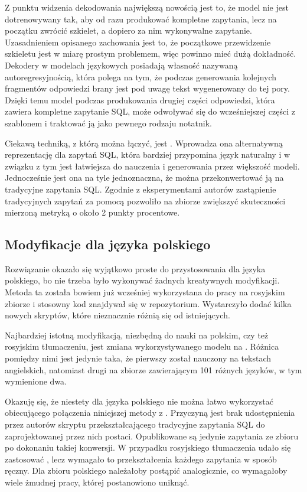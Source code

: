 Z punktu widzenia dekodowania największą nowością jest to, że model  nie jest dotrenowywany tak, aby od razu produkować kompletne zapytania, lecz na początku zwrócić szkielet, a dopiero za nim wykonywalne zapytanie. Uzasadnieniem opisanego zachowania jest to, że początkowe przewidzenie szkieletu jest w miarę prostym problemem, więc powinno mieć dużą dokładność. Dekodery w modelach językowych posiadają własność nazywaną autoregresyjnością, która polega na tym, że podczas generowania kolejnych fragmentów odpowiedzi brany jest pod uwagę tekst wygenerowany do tej pory. Dzięki temu model  podczas produkowania drugiej części odpowiedzi, która zawiera kompletne zapytanie SQL, może odwoływać się do wcześniejszej części z szablonem i traktować ją jako pewnego rodzaju notatnik.

Ciekawą techniką, z którą  można łączyć, jest  . Wprowadza ona alternatywną reprezentację dla zapytań SQL, która bardziej przypomina język naturalny i w związku z tym jest łatwiejsza do nauczenia i generowania przez większość modeli. Jednocześnie jest ona na tyle jednoznaczna, że można przekonwertować ją na tradycyjne zapytania SQL. Zgodnie z eksperymentami autorów  zastąpienie tradycyjnych zapytań za pomocą  pozwoliło na zbiorze  zwiększyć skuteczności mierzoną metryką  o około 2 punkty procentowe.

\subsection{Modyfikacje dla języka polskiego}
Rozwiązanie  okazało się wyjątkowo proste do przystosowania dla języka polskiego, bo nie trzeba było wykonywać żadnych kreatywnych modyfikacji. Metoda ta została bowiem już wcześniej wykorzystana do pracy na rosyjskim zbiorze  i stosowny kod znajdywał się w repozytorium. Wystarczyło dodać kilka nowych skryptów, które nieznacznie różnią się od istniejących.

Najbardziej istotną modyfikacją, niezbędną do nauki na polskim, czy też rosyjskim tłumaczeniu, jest zmiana wykorzystywanego modelu  na  . Różnica pomiędzy nimi jest jedynie taka, że pierwszy został nauczony na tekstach angielskich, natomiast drugi na zbiorze zawierającym 101 różnych języków, w tym wymienione dwa.

Okazuję się, że niestety dla języka polskiego nie można łatwo wykorzystać obiecującego połączenia niniejszej metody z . Przyczyną jest brak udostępnienia przez autorów  skryptu przekształcającego tradycyjne zapytania SQL do zaprojektowanej przez nich postaci. Opublikowane są jedynie zapytania ze zbioru  po dokonaniu takiej konwersji. W przypadku rosyjskiego tłumaczenia udało się zastosować , lecz wymagało to przekształcenia każdego zapytania w sposób ręczny. Dla zbioru polskiego należałoby postąpić analogicznie, co wymagałoby wiele żmudnej pracy, której postanowiono uniknąć.

